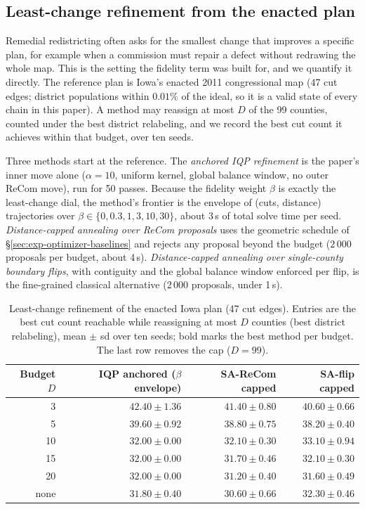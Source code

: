 \documentclass[11pt]{article}
\begin{document}
\subsection{Least-change refinement from the enacted plan}\label{sec:exp-leastchange}

Remedial redistricting often asks for the smallest change that
improves a specific plan, for example when a commission must repair a
defect without redrawing the whole map. This is the setting the
fidelity term was built for, and we quantify it directly. The
reference plan is Iowa's enacted 2011 congressional map (47 cut
edges; district populations within $0.01\%$ of the ideal, so it is a
valid state of every chain in this paper). A method may reassign at
most $D$ of the 99 counties, counted under the best district
relabeling, and we record the best cut count it achieves within that
budget, over ten seeds.

Three methods start at the reference. The \emph{anchored IQP
refinement} is the paper's inner move alone ($\alpha = 10$, uniform
kernel, global balance window, no outer ReCom move), run for 50
passes. Because the fidelity weight $\beta$ is exactly the
least-change dial, the method's frontier is the envelope of (cuts,
distance) trajectories over $\beta \in \{0, 0.3, 1, 3, 10, 30\}$,
about 3\,s of total solve time per seed. \emph{Distance-capped
annealing over ReCom proposals} uses the geometric schedule of
\S\ref{sec:exp-optimizer-baselines} and rejects any proposal beyond
the budget ($2\,000$ proposals per budget, about 4\,s).
\emph{Distance-capped annealing over single-county boundary flips},
with contiguity and the global balance window enforced per flip, is
the fine-grained classical alternative ($2\,000$ proposals, under
1\,s).

\begin{table}[H]
\centering
\small
\begin{tabular}{rrrr}
\toprule
Budget $D$ & IQP anchored ($\beta$ envelope) & SA-ReCom capped & SA-flip capped \\
\midrule
3  & $42.40 \pm 1.36$ & $41.40 \pm 0.80$ & $\mathbf{40.60 \pm 0.66}$ \\
5  & $39.60 \pm 0.92$ & $38.80 \pm 0.75$ & $\mathbf{38.20 \pm 0.40}$ \\
10 & $\mathbf{32.00 \pm 0.00}$ & $32.10 \pm 0.30$ & $33.10 \pm 0.94$ \\
15 & $32.00 \pm 0.00$ & $\mathbf{31.70 \pm 0.46}$ & $32.10 \pm 0.30$ \\
20 & $32.00 \pm 0.00$ & $\mathbf{31.20 \pm 0.40}$ & $31.60 \pm 0.49$ \\
none & $31.80 \pm 0.40$ & $\mathbf{30.60 \pm 0.66}$ & $32.30 \pm 0.46$ \\
\bottomrule
\end{tabular}
\caption{Least-change refinement of the enacted Iowa plan (47 cut
  edges). Entries are the best cut count reachable while reassigning
  at most $D$ counties (best district relabeling), mean $\pm$ sd over
  ten seeds; bold marks the best method per budget. The last row
  removes the cap ($D = 99$).}\label{tab:least-change}
\end{table}
\end{document}
